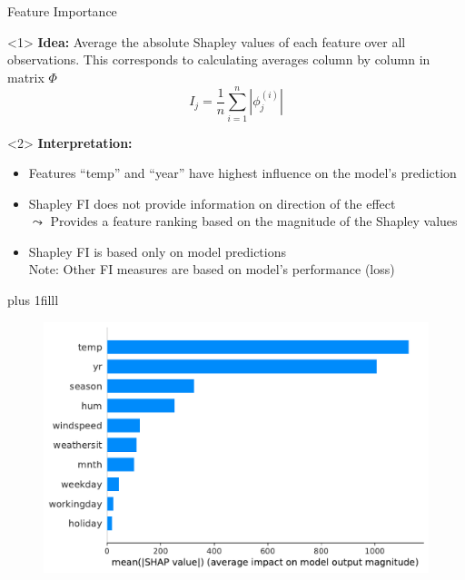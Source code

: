 \documentclass[11pt,compress,t,notes=noshow, aspectratio=169, xcolor=table]{beamer}
\newcommand{\btVFill}{\vskip0pt plus 1filll}
\begin{document}
 \begin{frame}{Feature Importance}

\begin{onlyenv}<1>
\textbf{Idea:} Average the absolute Shapley values of each feature over all observations. This corresponds to calculating averages column by column in matrix $\Phi$
$$
I_{j}=\frac{1}{n} \sum_{i=1}^{n}\left|\phi_{j}^{(i)}\right|
$$
\end{onlyenv}

\begin{onlyenv}<2>
\textbf{Interpretation:}
\begin{itemize}
    \item Features \enquote{temp} and \enquote{year} have highest influence on the model's prediction
    \item Shapley FI does not provide information on direction of the effect\\
    $\leadsto$ Provides a feature ranking based on the magnitude of the Shapley values %
    \item Shapley FI is based only on model predictions\\
    Note: Other FI measures are based on model's performance (loss)
\end{itemize}
 
\end{onlyenv}


\btVFill

\begin{figure}
    \centering
    \includegraphics[width=0.5\columnwidth]{figure_man/global_shap_fi.pdf}
\end{figure}

\end{frame}
 
\end{document}

